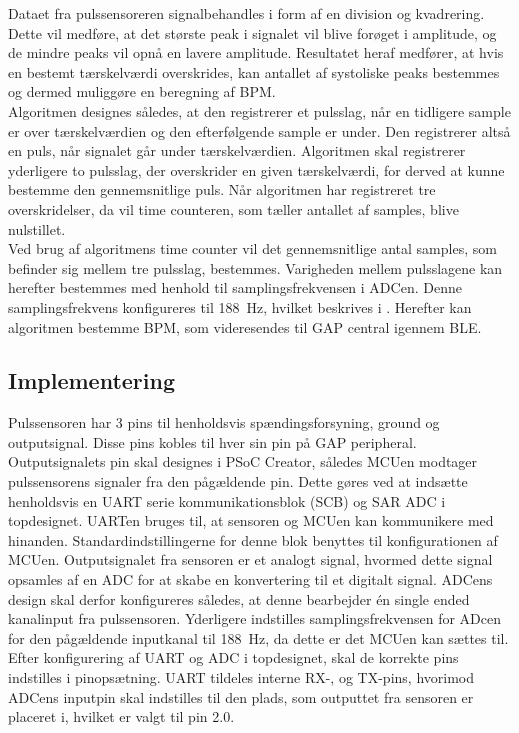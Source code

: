 Dataet fra pulssensoreren signalbehandles i form af en division og kvadrering. Dette vil medføre, at det største peak i signalet vil blive forøget i amplitude, og de mindre peaks vil opnå en lavere amplitude. Resultatet heraf medfører, at hvis en bestemt tærskelværdi overskrides, kan antallet af systoliske peaks bestemmes og dermed muliggøre en beregning af BPM. \\
Algoritmen designes således, at den registrerer et pulsslag, når en tidligere sample er over tærskelværdien og den efterfølgende sample er under. Den registrerer altså en puls, når signalet går under tærskelværdien. Algoritmen skal registrerer yderligere to pulsslag, der overskrider en given tærskelværdi, for derved at kunne bestemme den gennemsnitlige puls. Når algoritmen har registreret tre overskridelser, da vil time counteren, som tæller antallet af samples, blive nulstillet. \\
Ved brug af algoritmens time counter vil det gennemsnitlige antal samples, som befinder sig mellem tre pulsslag, bestemmes. Varigheden mellem pulsslagene kan herefter bestemmes med henhold til samplingsfrekvensen i ADCen. Denne samplingsfrekvens konfigureres til 188~Hz, hvilket beskrives i . Herefter kan algoritmen bestemme BPM, som videresendes til GAP central igennem BLE. 

\subsection{Implementering}
Pulssensoren har 3 pins til henholdsvis spændingsforsyning, ground og outputsignal. Disse pins kobles til hver sin pin på GAP peripheral. Outputsignalets pin skal designes i PSoC Creator, således MCUen modtager pulssensorens signaler fra den pågældende pin. Dette gøres ved at indsætte henholdsvis en UART serie kommunikationsblok (SCB) og SAR ADC i topdesignet. UARTen bruges til, at sensoren og MCUen kan kommunikere med hinanden. Standardindstillingerne for denne blok benyttes til konfigurationen af MCUen. \newline
Outputsignalet fra sensoren er et analogt signal, hvormed dette signal opsamles af en ADC for at skabe en konvertering til et digitalt signal. ADCens design skal derfor konfigureres således, at denne bearbejder én single ended kanalinput fra pulssensoren. Yderligere indstilles samplingsfrekvensen for ADcen for den pågældende inputkanal til 188~Hz, da dette er det MCUen kan sættes til. \\
Efter konfigurering af UART og ADC i topdesignet, skal de korrekte pins indstilles i pinopsætning. UART tildeles interne RX-, og TX-pins, hvorimod ADCens inputpin skal indstilles til den plads, som outputtet fra sensoren er placeret i, hvilket er valgt til pin 2.0. 

